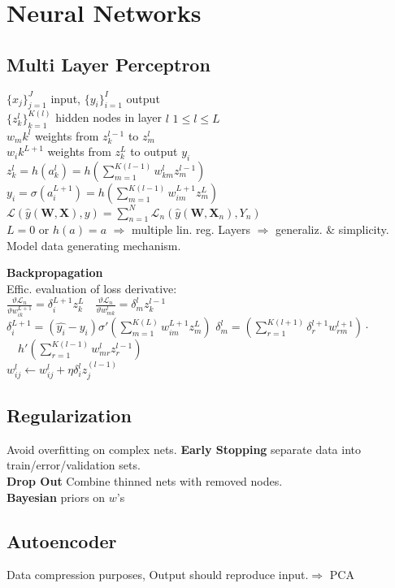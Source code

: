 \section*{Neural Networks}
\subsection*{Multi Layer Perceptron}
$\{x_j\}_{j=1}^J$ input, $\{y_i\}_{i=1}^I$ output\\
$\{z_k^l\}_{k=1}^{K(l)}$ hidden nodes in layer $l$ $1{\leq}l{\leq}L$\\
$w_mk^l$ weights from $z_k^{l-1}$ to $z_m^l$\\
$w_ik^{L+1}$ weights from $z_k^L$ to output $y_i$\\
$z_k^l=h(a_k^l)=h(\sum_{m=1}^{K(l-1)}w_{km}^lz_m^{l-1})$\\
$y_i=\sigma(a_i^{L+1})=h(\sum_{m=1}^{K(l-1)}w_{im}^{L+1}z_m^{L})$\\
$\mathcal{L}(\hat{y}(\mathbf{W}, \mathbf{X}), y){=}\sum_{n=1}^N\mathcal{L}_n(\hat{y}(\mathbf{W},\mathbf{X}_n),Y_n)$\\
$L=0$ or $h(a)=a$ $\Rightarrow$ multiple lin. reg.
Layers $\Rightarrow$ generaliz. \& simplicity.\\
Model data generating mechanism.

\textbf{Backpropagation}\\
Effic. evaluation of loss derivative:\\
$\frac{\vartheta\mathcal{L}_n}{\vartheta w_{ik}^{L+1}}{=}\delta_i^{L+1}z_k^L \quad \frac{\vartheta\mathcal{L}_n}{\vartheta w_{mk}^{l}}{=}\delta_m^{l}z_k^{l-1}$\\
$\delta_i^{L+1}{=}(\hat{y_i}{-}y_i)\sigma'(\sum_{m=1}^{K(L)}w_{im}^{L+1}z_m^L)$
$\delta_m^{l}{=}(\sum_{r=1}^{K(l+1)}\delta_r^{l+1}w_{rm}^{l+1})\cdot$\\$\quad h'(\sum_{r=1}^{K(l-1)}w_{mr}^lz_r^{l-1})$\\
$w_{ij}^{l}\leftarrow w_{ij}^{l}+\eta\delta_i^lz_j^{(l-1)}$
\subsection*{Regularization}
Avoid overfitting on complex nets.
\textbf{Early Stopping} separate data into train/error/validation sets.\\
\textbf{Drop Out} Combine thinned nets with removed nodes.\\
\textbf{Bayesian} priors on $w$'s

\subsection*{Autoencoder}
Data compression purposes, Output should reproduce input.$\Rightarrow$ PCA

